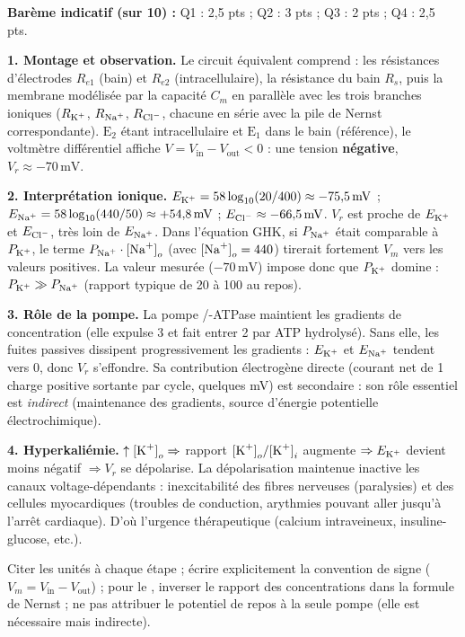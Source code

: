 \documentclass[11pt]{article}
\begin{document}
\begin{corrige}
\textbf{Barème indicatif (sur 10) :} Q1 : 2,5 pts ; Q2 : 3 pts ; Q3 : 2 pts ; Q4 : 2,5 pts.

\textbf{1. Montage et observation.} Le circuit équivalent comprend : les résistances d'électrodes $R_{e1}$ (bain) et $R_{e2}$ (intracellulaire), la résistance du bain $R_s$, puis la membrane modélisée par la capacité $C_m$ en parallèle avec les trois branches ioniques ($R_{\ce{K+}}$, $R_{\ce{Na+}}$, $R_{\ce{Cl-}}$, chacune en série avec la pile de Nernst correspondante). $\text{E}_2$ étant intracellulaire et $\text{E}_1$ dans le bain (référence), le voltmètre différentiel affiche $V = V_{\text{in}} - V_{\text{out}} < 0$ : une tension \textbf{négative}, $V_r \approx -70\,\text{mV}$.

\textbf{2. Interprétation ionique.} $E_{\ce{K+}} = 58 \log_{10}(20/400) \approx -75{,}5\,\text{mV}$ ; $E_{\ce{Na+}} = 58 \log_{10}(440/50) \approx +54{,}8\,\text{mV}$ ; $E_{\ce{Cl-}} \approx -66{,}5\,\text{mV}$. $V_r$ est proche de $E_{\ce{K+}}$ et $E_{\ce{Cl-}}$, très loin de $E_{\ce{Na+}}$. Dans l'équation GHK, si $P_{\ce{Na+}}$ était comparable à $P_{\ce{K+}}$, le terme $P_{\ce{Na+}} \cdot {[\ce{Na+}]}_{o}$ (avec ${[\ce{Na+}]}_{o} = 440$) tirerait fortement $V_m$ vers les valeurs positives. La valeur mesurée ($-70\,\text{mV}$) impose donc que $P_{\ce{K+}}$ domine : $P_{\ce{K+}} \gg P_{\ce{Na+}}$ (rapport typique de 20 à 100 au repos).

\textbf{3. Rôle de la pompe.} La pompe /-ATPase maintient les gradients de concentration (elle expulse 3  et fait entrer 2  par ATP hydrolysé). Sans elle, les fuites passives dissipent progressivement les gradients : $E_{\ce{K+}}$ et $E_{\ce{Na+}}$ tendent vers 0, donc $V_r$ s'effondre. Sa contribution électrogène directe (courant net de 1 charge positive sortante par cycle, quelques mV) est secondaire : son rôle essentiel est \emph{indirect} (maintenance des gradients, source d'énergie potentielle électrochimique).

\textbf{4. Hyperkaliémie.} $\uparrow {[\ce{K+}]}_{o} \Rightarrow$ rapport ${[\ce{K+}]}_{o}/{[\ce{K+}]}_{i}$ augmente $\Rightarrow E_{\ce{K+}}$ devient moins négatif $\Rightarrow V_r$ se dépolarise. La dépolarisation maintenue inactive les canaux  voltage-dépendants : inexcitabilité des fibres nerveuses (paralysies) et des cellules myocardiques (troubles de conduction, arythmies pouvant aller jusqu'à l'arrêt cardiaque). D'où l'urgence thérapeutique (calcium intraveineux, insuline-glucose, etc.).

\begin{attention}
Citer les unités à chaque étape ; écrire explicitement la convention de signe ($V_m = V_{\text{in}} - V_{\text{out}}$) ; pour le , inverser le rapport des concentrations dans la formule de Nernst ; ne pas attribuer le potentiel de repos à la seule pompe (elle est nécessaire mais indirecte).
\end{attention}
\end{corrige}
\end{document}
